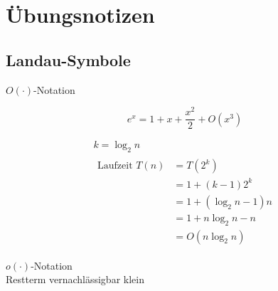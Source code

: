 \part{Übungsnotizen}
\setcounter{chapter}{0}
\chapter{Landau-Symbole}
$O(\cdot)$-Notation \\
\begin{bsp*}
	\[ e^x = 1 + x+ \frac{x^2}{2} + O(x^3) \]
\end{bsp*} 
\begin{bsp*}[note = Mergesort]
	\begin{gather*}
		k = \log_2 n \\
		\begin{split}
			\text{Laufzeit } T(n)	&= T(2^k) \\
							&= 1 + (k-1) 2^k \\
							&= 1 + (\log_2 n - 1 ) n \\
							&= 1 + n \log_2 n  - n \\
							&= O( n \log_2 n )
		\end{split}
	\end{gather*}
\end{bsp*}

$o(\cdot)$-Notation\\
Restterm vernachlässigbar klein